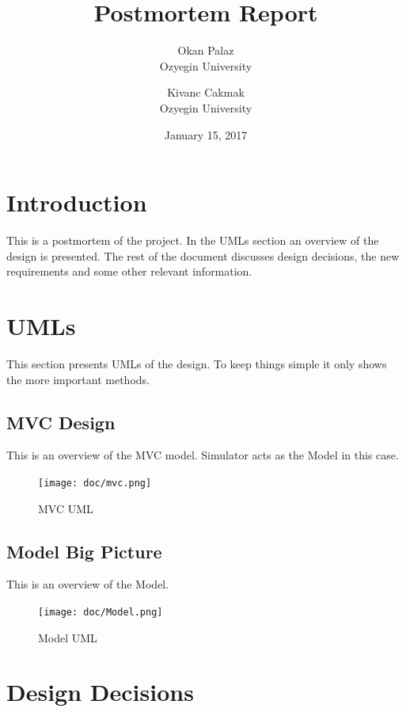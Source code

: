 \documentclass[]{article}
\date{}
\begin{document}
\title{Postmortem Report}
\date{January 15, 2017}
\author{Okan Palaz\\ Ozyegin University \and Kivanc Cakmak \\ Ozyegin University}

\maketitle

\section{Introduction}\label{introduction}

This is a postmortem of the project. In the UMLs section an overview of
the design is presented. The rest of the document discusses design
decisions, the new requirements and some other relevant information.

\section{UMLs}\label{umls}

This section presents UMLs of the design. To keep things simple it only shows
the more important methods.

\subsection{MVC Design}\label{mvc-design}

This is an overview of the MVC model. Simulator acts as the Model in
this case.

\begin{figure}[H]
\centering
\texttt{[image: doc/mvc.png]}
\caption{MVC UML}
\end{figure}

\subsection{Model Big Picture}\label{model-big-picture}

This is an overview of the Model.

\begin{figure}[H]
\centering
\texttt{[image: doc/Model.png]}
\caption{Model UML}
\end{figure}

\section{Design Decisions}\label{design-decisions}
\end{document}
